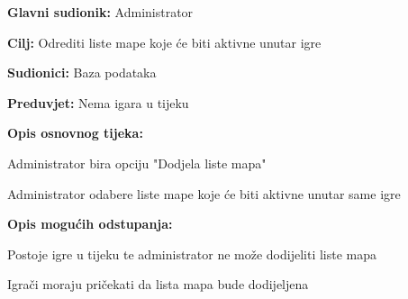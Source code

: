 										\noindent {}
					\begin{packed_item}
	
						\item \textbf{Glavni sudionik: } Administrator
						\item  \textbf{Cilj:} Odrediti liste mape koje će biti aktivne unutar igre
						\item  \textbf{Sudionici:} Baza podataka
						\item  \textbf{Preduvjet:} Nema igara u tijeku
						\item  \textbf{Opis osnovnog tijeka:}
						
						\item[] \begin{packed_enum}
	
							    \item Administrator bira opciju "Dodjela liste mapa"
    							\item Administrator odabere liste mape koje će biti aktivne unutar same igre
						\end{packed_enum}
						
						\item  \textbf{Opis mogućih odstupanja:}
						
						\item[] \begin{packed_item}
	
							\item[2.b] 
							\item[] \begin{packed_enum}
								
								\item  Postoje igre u tijeku te administrator ne može dodijeliti liste mapa
								\item  Igrači moraju pričekati da lista mapa bude dodijeljena
								
							\end{packed_enum}
							
						\end{packed_item}
					\end{packed_item}
					
